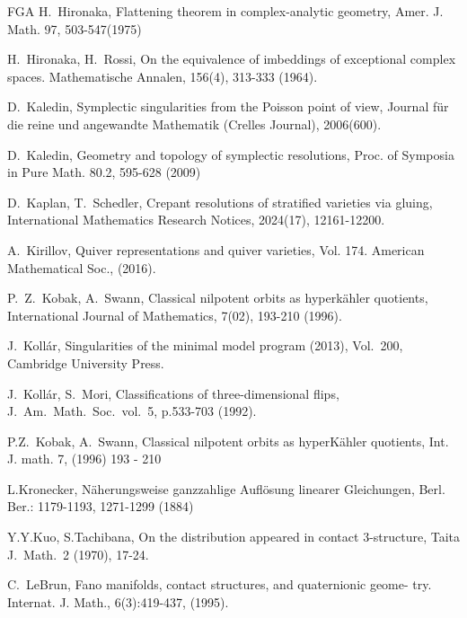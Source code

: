 \documentclass[12pt,a4paper]{amsart}
\theoremstyle{remark}
\theoremstyle{definition}
\begin{document}
\begin{thebibliography}{FGA}
H.~Hironaka, Flattening theorem in complex-analytic geometry, Amer. J. Math. 97, 503-547(1975)

H.~Hironaka, H.~Rossi, 
On the equivalence of imbeddings of exceptional complex spaces. Mathematische Annalen, 156(4), 313-333 (1964). 


D.~Kaledin, Symplectic singularities from the Poisson point of view, 
Journal f\"ur die reine und angewandte Mathematik (Crelles Journal), 2006(600). 

D.~Kaledin, Geometry and topology of symplectic resolutions, Proc. of Symposia in Pure Math. 80.2, 595-628 (2009)

D.~Kaplan, T.~Schedler, 
Crepant resolutions of stratified varieties via gluing, International Mathematics Research Notices, 2024(17), 
12161-12200. 


A.~Kirillov, 
Quiver representations and quiver varieties, 
Vol. 174. American Mathematical Soc., (2016). 

P.~Z.~Kobak, A.~Swann, Classical nilpotent orbits as hyperk\"ahler quotients, 
International Journal of Mathematics, 7(02), 193-210 (1996). 

J.~Koll\'ar, 
Singularities of the minimal model program (2013), Vol.\ 200, 
Cambridge University Press. 

J.~Koll\'ar, S.~Mori, 
Classifications of three-dimensional flips, 
J.\ Am.\ Math.\ Soc.\ vol.\ 5, p.533-703 (1992). 

 P.Z.~Kobak, A.~Swann, Classical nilpotent orbits as hyperK\"ahler quotients, Int. J. math. 7, (1996) 193 - 210  

L.Kronecker, N\"aherungsweise ganzzahlige Aufl\"osung linearer Gleichungen, Berl. Ber.: 1179-1193, 1271-1299 
(1884) 

Y.Y.Kuo, S.Tachibana, 
On the distribution appeared in contact 
$3$-structure, Taita J.\ Math.\ 2 (1970), 
17-24. 

C.~LeBrun, Fano manifolds, contact structures, and quaternionic geome- try. Internat. J. Math., 6(3):419-437, (1995). 


\end{thebibliography}
\end{document}
